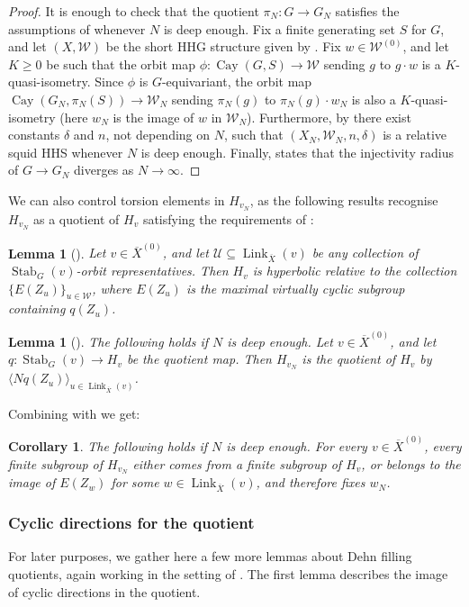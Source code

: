 \documentclass[svgnames]{amsart}
\theoremstyle{plain}
\newtheorem{lem}[thm]{Lemma}
\newtheorem{cor}[thm]{Corollary}
\theoremstyle{definition}
\newcommand{\link}[2]{\operatorname{Link}_{#1}\left(#2\right)}
\newcommand{\W}{\mathcal{W}}
\newcommand{\squid}[1]{squid}
\newcommand{\Cay}[2]{\operatorname{Cay}\left(#1,#2\right)}
\newcommand{\Stab}[2]{\operatorname{Stab}_{#1}\left(#2\right)}
\newcommand{\ov}[1]{\overline{#1}}
\begin{document}
\begin{proof}
    It is enough to check that the quotient $\pi_N\colon G\to G_N$ satisfies the assumptions of  whenever $N$ is deep enough. Fix a finite generating set $S$ for $G$, and let $(X,\W)$ be the short HHG structure given by . Fix $w\in \W^{(0)}$, and let $K\ge 0$ be such that the orbit map $\phi\colon\Cay{G}{S}\to \W$ sending $g$ to $g\cdot w$ is a $K$-quasi-isometry. Since $\phi$ is $G$-equivariant, the orbit map $\Cay{G_N}{\pi_N(S)}\to \W_N$ sending $\pi_N(g)$ to $\pi_N(g)\cdot w_N$ is also a $K$-quasi-isometry (here $w_N$ is the image of $w$ in $\W_N$). Furthermore, by  there exist constants $\delta$ and $n$, not depending on $N$, such that $(X_N,\W_N,n,\delta)$ is a relative \squid{} HHS whenever $N$ is deep enough. Finally,  states that the injectivity radius of $G\to G_N$ diverges as $N\to \infty$.
\end{proof}

\noindent We can also control torsion elements in $H_{v_N}$, as the following results recognise $H_{v_N}$ as a quotient of $H_v$ satisfying the requirements of :
\begin{lem}[{\cite[Lemma 2.17]{short_HHG:I}}]
    Let $v\in \ov X^{(0)}$, and let $\mathcal U\subseteq\link{\ov X}{v}$ be any collection of $\Stab{G}{v}$-orbit representatives. Then $H_{v}$ is hyperbolic relative to the collection $\{E(Z_u)\}_{u\in \mathcal W}$, where $E(Z_u)$ is the maximal virtually cyclic subgroup containing $q(Z_u)$.
\end{lem}
\begin{lem}[{\cite[Lemma 3.42]{short_HHG:II}}]
\label{lem:H_v}  
The following holds if $N$ is deep enough. Let $v\in \ov X^{(0)}$, and let $q\colon \Stab{G}{v}\to H_{v}$ be the quotient map. Then $H_{v_N}$ is the quotient of $H_v$ by $\langle Nq(Z_u)\rangle_{u\in \link{\ov X}{v}}$.
\end{lem}
\noindent Combining  with  we get:
\begin{cor}\label{cor:torsion_of_hv}
    The following holds if $N$ is deep enough. For every $v\in \ov X^{(0)}$, every finite subgroup of $H_{v_N}$ either comes from a finite subgroup of $H_v$, or belongs to the image of $E(Z_w)$ for some $w\in \link{\ov X}{v}$, and therefore fixes $w_N$.
\end{cor}

\subsubsection{Cyclic directions for the quotient}
For later purposes, we gather here a few more lemmas about Dehn filling quotients, again working in the setting of . The first lemma describes the image of cyclic directions in the quotient. 
\end{document}
